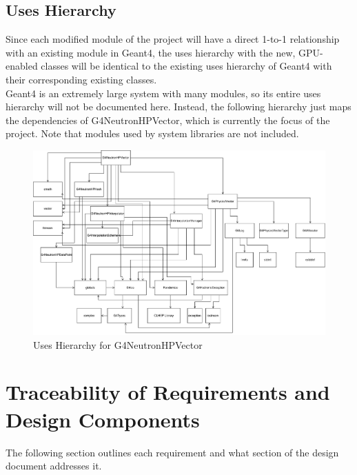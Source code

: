 \documentclass[12pt]{article}
\begin{document}
\subsection{Uses Hierarchy}
Since each modified module of the project will have a direct 1-to-1 relationship with an existing module in Geant4, the uses hierarchy with the new, GPU-enabled classes will be identical to the existing uses hierarchy of Geant4 with their corresponding existing classes.\\

Geant4 is an extremely large system with many modules, so its entire uses hierarchy will not be documented here. Instead, the following hierarchy just maps the dependencies of G4NeutronHPVector, which is currently the focus of the project. Note that modules used by system libraries are not included.
\begin{figure}
\caption{Uses Hierarchy for G4NeutronHPVector}\label{imgUsesHierarchy}
\includegraphics[width=\textwidth]{uses_hierarchy.pdf}
\end{figure}

\section{Traceability of Requirements and Design Components}%
The following section outlines each requirement and what section of the design document addresses it.
\end{document}
